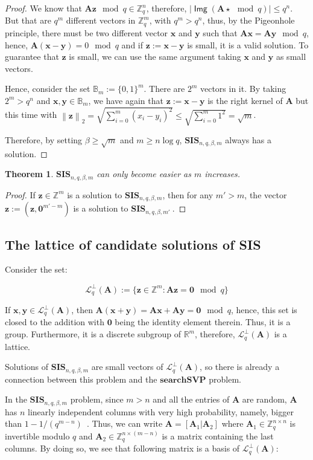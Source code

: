 \documentclass[a4paper,11pt]{article}
\let\vec\mathbf %
\newcommand\Zq{{\mathbb Z}_q}
\newcommand\Zqn{{\mathbb Z}_q^n}
\newcommand\Zqm{{\mathbb Z}_q^m}
\newcommand\Zm{{\mathbb Z}^m}
\newcommand\A{{\mathbf A}}
\newcommand\LqA{\mathcal{L}_q^{\bot}\left(\A\right)}
\newcommand\SIS{\textbf{SIS}_{n, q, \beta, m}}
\newcommand\SVP{\textbf{searchSVP}}
\DeclareMathOperator{\img}{\textsf{Img}}
\newcommand{\norm}[1]{\left\lVert #1 \right\rVert_2}
\newtheorem{theorem}{Theorem}[section]
\theoremstyle{definition}
\theoremstyle{remark}
\begin{document}
\begin{proof}
We know that $\A \vec z \mod q \in \Zqn$, therefore, $|\img(\A \star \mod q)|
\le q^n$. But that are $q^m$ different vectors in $\Zqm$, with $q^m > q^n$,
thus, by the Pigeonhole principle, there must be two different vector $\vec x$
and $\vec y$ such that $\A \vec x = \A \vec y \mod q$, hence, $\A (\vec{x - y})
= 0 \mod q$ and if $\vec z := \vec{x - y}$ is small, it is a valid solution. To
guarantee that $\vec z$ is small, we can use the same argument taking $\vec x$
and $\vec y$ as small vectors.

Hence, consider the set $\mathbb{B}_m := \{0, 1\}^m$. There are $2^m$ vectors
in it. By taking $2^m > q^n$ and $\vec x, \vec y \in \mathbb{B}_m$, we have
again that $\vec z := \vec{x - y}$ is the right kernel of $\A$ but this time
with $\norm{\vec z} = \sqrt{\sum_{i=0}^{m} (x_i - y_i)^2} \le
\sqrt{\sum_{i=0}^{m} 1^2} = \sqrt{m}$.

Therefore, by setting $\beta \ge \sqrt{m}$ and $m \ge n\log q$, $\SIS$ always 
has a solution.
\end{proof}


\begin{theorem}
$\SIS$  can only become easier as $m$ increases.
\end{theorem}
\begin{proof}
If $\vec z \in \Zm$ is a solution to $\SIS$, then for any $m' > m$, the vector
$\vec z := (\vec z , \vec 0^{m' - m})$ is a solution to \textbf{SIS}$_{n, q,
\beta, m'}~$.
\end{proof}

\subsection{The lattice of candidate solutions of SIS}

Consider the set:

$$ \LqA := \{ \vec z \in \Zm : \A \vec z = \vec 0 \mod q \}$$

If $\vec x, \vec y \in \LqA$, then $\A(\vec x + \vec y) = \A\vec x + \A\vec y =
\vec 0 \mod q$, hence, this set is closed to the addition with $\vec 0$ being
the identity element therein. Thus, it is a group. Furthermore, it is a
discrete subgroup of $\mathbb{R}^m$, therefore, $\LqA$ is a lattice.

Solutions of $\SIS$ are small vectors of $\LqA$, so there is already a 
connection between this problem and the $\SVP$ problem.

In the $\SIS$ problem, since $m > n$ and all the entries of $\A$ are random, 
$\A$
has $n$ linearly independent columns with very high probability, namely, bigger
than $1 - 1/(q^{m-n})$~\cite{Kudo16}. Thus, we can write $\A = [\A_1 | \A_2]$
where $\A_1 \in \Zq^{n\times n}$ is invertible modulo $q$ and $\A_2 \in
\Zq^{n\times (m-n)}$ is a matrix containing the last columns. By doing so, we
see that following matrix is a basis of $\LqA$:
\end{document}
